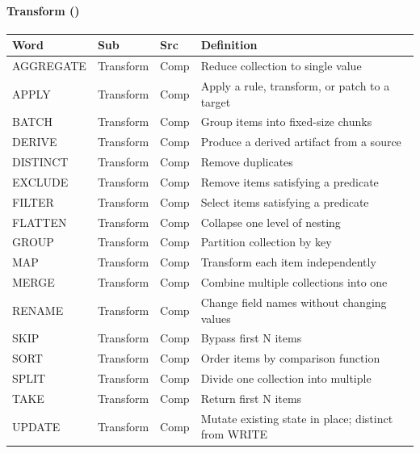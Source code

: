 \documentclass{article}
\begin{document}
\paragraph{Transform (\VocabVerbsTransform)}
\small
\begin{tabular}{lllp{7cm}}
\toprule \textbf{Word} & \textbf{Sub} & \textbf{Src} & \textbf{Definition} \\ \midrule
AGGREGATE & Transform & Comp & Reduce collection to single value \\
APPLY & Transform & Comp & Apply a rule, transform, or patch to a target \\
BATCH & Transform & Comp & Group items into fixed-size chunks \\
DERIVE & Transform & Comp & Produce a derived artifact from a source \\
DISTINCT & Transform & Comp & Remove duplicates \\
EXCLUDE & Transform & Comp & Remove items satisfying a predicate \\
FILTER & Transform & Comp & Select items satisfying a predicate \\
FLATTEN & Transform & Comp & Collapse one level of nesting \\
GROUP & Transform & Comp & Partition collection by key \\
MAP & Transform & Comp & Transform each item independently \\
MERGE & Transform & Comp & Combine multiple collections into one \\
RENAME & Transform & Comp & Change field names without changing values \\
SKIP & Transform & Comp & Bypass first N items \\
SORT & Transform & Comp & Order items by comparison function \\
SPLIT & Transform & Comp & Divide one collection into multiple \\
TAKE & Transform & Comp & Return first N items \\
UPDATE & Transform & Comp & Mutate existing state in place; distinct from WRITE \\
\bottomrule
\end{tabular}
\normalsize
\end{document}
